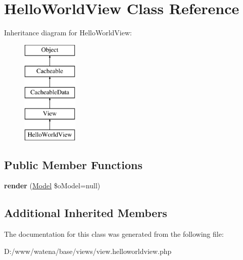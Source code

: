 \hypertarget{class_hello_world_view}{\section{Hello\-World\-View Class Reference}
\label{class_hello_world_view}
}
Inheritance diagram for Hello\-World\-View\-:\begin{figure}[H]
\begin{center}
\leavevmode
\includegraphics[height=5.000000cm]{class_hello_world_view}
\end{center}
\end{figure}
\subsection*{Public Member Functions}
\begin{DoxyCompactItemize}
\item 
\hypertarget{class_hello_world_view_abfc2c5a8ba765cef58c079b85d362a73}{{\bfseries render} (\hyperlink{class_model}{Model} \$o\-Model=null)}\label{class_hello_world_view_abfc2c5a8ba765cef58c079b85d362a73}

\end{DoxyCompactItemize}
\subsection*{Additional Inherited Members}


The documentation for this class was generated from the following file\-:\begin{DoxyCompactItemize}
\item 
D\-:/www/watena/base/views/view.\-helloworldview.\-php\end{DoxyCompactItemize}
